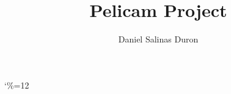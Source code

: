 \documentclass{tufte-book}
\title{Pelicam Project}
\author{Daniel Salinas Duron}
\begin{document}
\maketitle 

\frontmatter


{\catcode`\%=12 }
\end{document}

